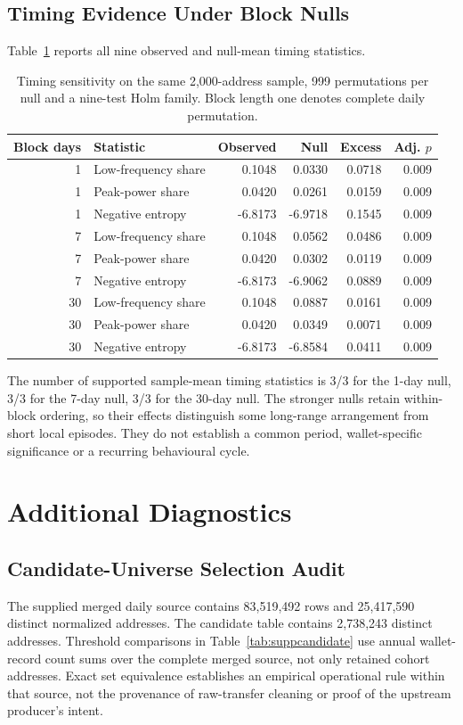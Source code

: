 \documentclass[journal,letterpaper]{IEEEtran}
\begin{document}
\subsection{Timing Evidence Under Block Nulls}
Table~\ref{tab:blocktiming} reports all nine observed and null-mean timing statistics.
\begin{table}[t]
\centering\footnotesize
\caption{Timing sensitivity on the same 2,000-address sample, 999 permutations per null and a nine-test Holm family. Block length one denotes complete daily permutation.}
\label{tab:blocktiming}
\begin{tabular}{rlrrrr}
\toprule
Block days & Statistic & Observed & Null & Excess & Adj. $p$ \\
\midrule
1 & Low-frequency share & 0.1048 & 0.0330 & 0.0718 & 0.009 \\
1 & Peak-power share & 0.0420 & 0.0261 & 0.0159 & 0.009 \\
1 & Negative entropy & -6.8173 & -6.9718 & 0.1545 & 0.009 \\
7 & Low-frequency share & 0.1048 & 0.0562 & 0.0486 & 0.009 \\
7 & Peak-power share & 0.0420 & 0.0302 & 0.0119 & 0.009 \\
7 & Negative entropy & -6.8173 & -6.9062 & 0.0889 & 0.009 \\
30 & Low-frequency share & 0.1048 & 0.0887 & 0.0161 & 0.009 \\
30 & Peak-power share & 0.0420 & 0.0349 & 0.0071 & 0.009 \\
30 & Negative entropy & -6.8173 & -6.8584 & 0.0411 & 0.009 \\
\bottomrule
\end{tabular}
\end{table}
The number of supported sample-mean timing statistics is 3/3 for the 1-day null, 3/3 for the 7-day null, 3/3 for the 30-day null. The stronger nulls retain within-block ordering, so their effects distinguish some long-range arrangement from short local episodes. They do not establish a common period, wallet-specific significance or a recurring behavioural cycle.

\section{Additional Diagnostics}
\subsection{Candidate-Universe Selection Audit}
The supplied merged daily source contains 83,519,492 rows and 25,417,590 distinct normalized addresses. The candidate table contains 2,738,243 distinct addresses. Threshold comparisons in Table~\ref{tab:suppcandidate} use annual wallet-record count sums over the complete merged source, not only retained cohort addresses. Exact set equivalence establishes an empirical operational rule within that source, not the provenance of raw-transfer cleaning or proof of the upstream producer's intent.
\end{document}
